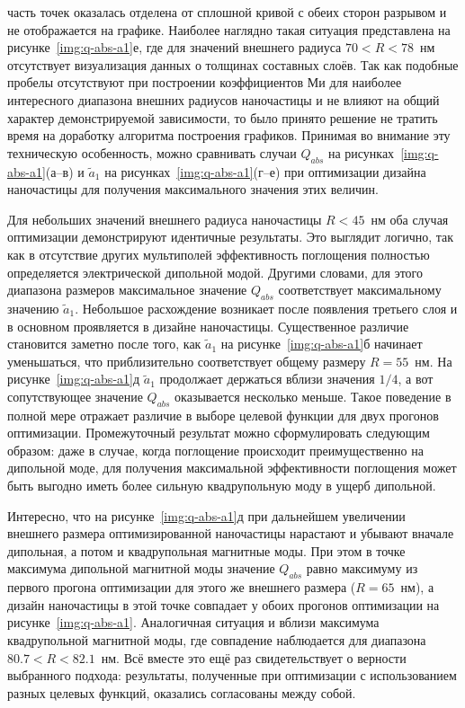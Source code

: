 часть точек оказалась отделена от сплошной кривой с обеих сторон
разрывом и не отображается на графике.  Наиболее наглядно такая
ситуация представлена на рисунке~\ref{img:q-abs-a1}е, где для значений
внешнего радиуса $70<R<78$~нм отсутствует визуализация данных о
толщинах составных слоёв.  Так как подобные пробелы отсутствуют при
построении коэффициентов Ми для наиболее интересного диапазона внешних
радиусов наночастицы и не влияют на общий характер демонстрируемой
зависимости, то было принято решение не тратить время на доработку
алгоритма построения графиков.  Принимая во внимание эту техническую
особенность, можно сравнивать случаи $Q_{abs}$ на
рисунках~\ref{img:q-abs-a1}(а--в) и $\tilde{a}_1$ на
рисунках~\ref{img:q-abs-a1}(г--е) при оптимизации дизайна наночастицы
для получения максимального значения этих величин.

Для небольших значений внешнего радиуса наночастицы $R<45$~нм оба
случая оптимизации демонстрируют идентичные результаты. Это выглядит
логично, так как в отсутствие других мультиполей эффективность
поглощения полностью определяется электрической дипольной
модой. Другими словами, для этого диапазона размеров максимальное
значение $Q_{abs}$ соответствует максимальному значению
$\tilde{a}_1$. Небольшое расхождение возникает после появления
третьего слоя и в основном проявляется в дизайне наночастицы.
Существенное различие становится заметно после того, как $\tilde{a}_1$
на рисунке~\ref{img:q-abs-a1}б начинает уменьшаться, что
приблизительно соответствует общему размеру $R=55$~нм. На
рисунке~\ref{img:q-abs-a1}д $\tilde{a}_1$ продолжает держаться
вблизи значения $1/4$, а вот сопутствующее значение $Q_{abs}$
оказывается несколько меньше. Такое поведение в полной мере отражает
различие в выборе целевой функции для двух прогонов
оптимизации. Промежуточный результат можно сформулировать следующим
образом: даже в случае, когда поглощение происходит преимущественно на
дипольной моде, для получения максимальной эффективности поглощения
может быть выгодно иметь более сильную квадрупольную моду в ущерб
дипольной.

Интересно, что на рисунке~\ref{img:q-abs-a1}д при дальнейшем
увеличении внешнего размера оптимизированной наночастицы нарастают и
убывают вначале дипольная, а потом и квадрупольная магнитные моды. При
этом в точке максимума дипольной магнитной моды значение $Q_{abs}$
равно максимуму из первого прогона оптимизации для этого же внешнего
размера ($R=65$~нм), а дизайн наночастицы в этой точке совпадает у
обоих прогонов оптимизации на рисунке~\ref{img:q-abs-a1}.  Аналогичная
ситуация и вблизи максимума квадрупольной магнитной моды, где
совпадение наблюдается для диапазона $80.7<R<82.1$~нм.  Всё вместе это
ещё раз свидетельствует о верности выбранного подхода: результаты,
полученные при оптимизации с использованием разных целевых функций,
оказались согласованы между собой. 

